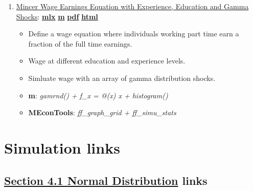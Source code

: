 \documentclass[
]{book}
\providecommand{\tightlist}{%
  \setlength{\itemsep}{0pt}\setlength{\parskip}{0pt}}
\begin{document}
\begin{enumerate}
\def\labelenumi{\arabic{enumi}.}
\tightlist
\item
  \href{https://fanwangecon.github.io/M4Econ/panel/crosssection/htmlpdfm/fs_wage_equation.html}{Mincer Wage Earnings Equation with Experience, Education and Gamma Shocks}: \href{https://github.com/FanWangEcon/M4Econ/blob/master/panel/crosssection/fs_wage_equation.mlx}{\textbf{mlx}} \textbar{} \href{https://github.com/FanWangEcon/M4Econ/blob/master/panel/crosssection/htmlpdfm/fs_wage_equation.m}{\textbf{m}} \textbar{} \href{https://github.com/FanWangEcon/M4Econ/blob/master/panel/crosssection/htmlpdfm/fs_wage_equation.pdf}{\textbf{pdf}} \textbar{} \href{https://fanwangecon.github.io/M4Econ/panel/crosssection/htmlpdfm/fs_wage_equation.html}{\textbf{html}}

  \begin{itemize}
  \tightlist
  \item
    Define a wage equation where individuals working part time earn a fraction of the full time earnings.
  \item
    Wage at different education and experience levels.
  \item
    Simluate wage with an array of gamma distribution shocks.
  \item
    \textbf{m}: \emph{gamrnd() + f\_x = @(x) x + histogram()}
  \item
    \textbf{MEconTools}: \emph{ff\_graph\_grid + ff\_simu\_stats}
  \end{itemize}
\end{enumerate}

\hypertarget{simulation-links}{%
\section{Simulation links}\label{simulation-links}}

\hypertarget{section-4.1-normal-distributionnormal-distribution-links}{%
\subsection{\texorpdfstring{\protect\hyperlink{normal-distribution}{Section 4.1 Normal Distribution} links}{Section 4.1 Normal Distribution links}}\label{section-4.1-normal-distributionnormal-distribution-links}}
\end{document}
